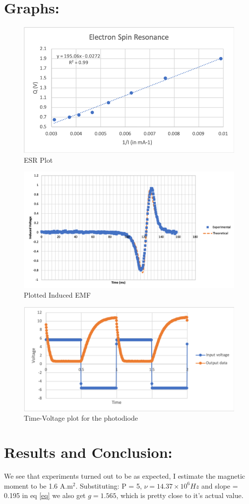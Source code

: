 \documentclass{multi}
\begin{document}
\section{Graphs:}
\begin{figure}[H]
\includegraphics[width=0.8\columnwidth]{esr.png}
\centering
\caption{ESR Plot}
\end{figure}
\begin{figure}[H]
\includegraphics[width=0.8\columnwidth]{emf.png}
\centering
\caption{Plotted Induced EMF}
\end{figure}
\begin{figure}[H]
\includegraphics[width=0.8\columnwidth]{photo.png}
\centering
\caption{Time-Voltage plot for the photodiode}
\end{figure}
\section{Results and Conclusion:}
We see that experiments turned out to be as expected, I estimate the magnetic moment to be 1.6 A.m$^2$. Substituting: P = 5, $\nu = 14.37 \times 10^6 Hz$ and slope = 0.195 in eq \ref{eq} we also get $g = 1.565$, which is pretty close to it's actual value.
\end{document}
